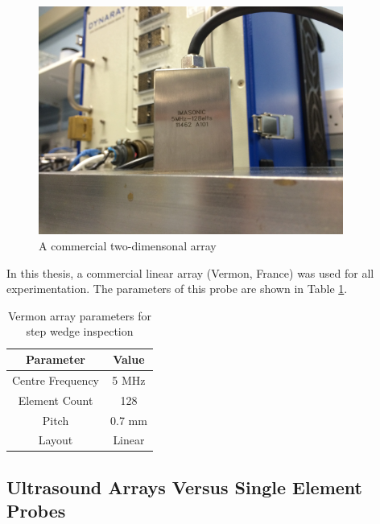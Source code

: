 \begin{figure}[htp]
\centering
		\includegraphics[width=100mm]{Array.jpg}
		\caption{A commercial two-dimensonal array}
		\label{fig:review_arraypic}
\end{figure}

In this thesis, a commercial linear array (Vermon, France) was used for all experimentation. The parameters of this probe are shown in Table \ref{table:vermon_5mhz}.

\begin{table}[htbp!]
\begin{center}
	\begin{tabular}{| c | c |}
	\hline 
	\textbf{Parameter} & \textbf{Value} \\ \hline \hline 
	Centre Frequency	& 5 MHz \\ \hline
	Element Count & 128 \\ \hline
	Pitch & 0.7 mm \\ \hline
	Layout & Linear \\ \hline
	\end{tabular}
	\caption{Vermon array parameters for step wedge inspection}
	\label{table:vermon_5mhz}
	\end{center}
	\end{table}


\subsection{Ultrasound Arrays Versus Single Element Probes}

